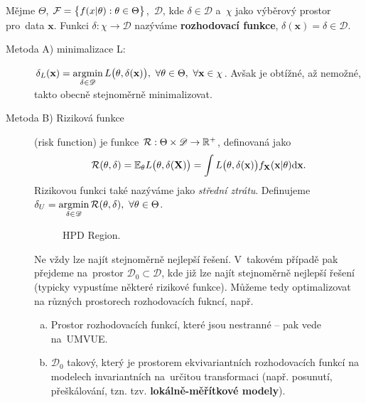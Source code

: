 \begin{define}
	Mějme $\Theta$, $\mathcal{F}=\big\{ f(x|\theta):\theta\in\Theta \big\}$,~$\mathscr{D}$, kde $\delta\in\mathscr{D}$ a~$\chi$ jako výběrový prostor pro~data $\textbf{x}$. Funkci $\delta:\chi\to\mathscr{D}$ nazýváme \textbf{rozhodovací funkce}, $\delta(\textbf{x})=\delta\in\mathscr{D}$. 
\end{define}
\begin{description}
	\item[Metoda A) minimalizace L:] $\delta_L(\textbf{x})=\mathop{\mathrm{argmin}}\limits_{\delta\in\mathscr{D}} L\big(\theta,\delta(\textbf{x})\big),~\forall \theta\in\Theta,~\forall\textbf{x}\in\chi$. Avšak je obtížné, až nemožné, takto obecně stejnoměrně minimalizovat.
	\item[Metoda B) Riziková funkce] (risk function) je funkce $\mathcal{R}:\Theta\times\mathscr{D}\to\mathbb{R}^+$, definovaná jako $$\mathcal{R}(\theta,\delta)=\mathbb{E}_\theta L\big(\theta,\delta(\textbf{X})\big)=\int L\big(\theta,\delta(\textbf{x})\big)f_\textbf{X}(\textbf{x}|\theta)\mathrm{d}\textbf{x}.$$
	Rizikovou funkci také nazýváme jako \textit{střední ztrátu}. Definujeme $\delta_U=\mathop{\mathrm{argmin}}\limits_{\delta\in\mathscr{D}} \mathcal{R}(\theta,\delta),~\forall\theta\in\Theta$.
	
	\begin{figure}[h]
		\centering
		\caption{HPD Region.}
	\end{figure}
	
	Ne vždy lze najít stejnoměrně nejlepší řešení. V~takovém případě pak přejdeme na~prostor $\mathscr{D}_0\subset\mathscr{D}$, kde již lze najít stejnoměrně nejlepší řešení (typicky vypustíme některé rizikové funkce). Můžeme tedy optimalizovat na různých prostorech rozhodovacích fukncí, např.
	\begin{enumerate}[a)]
		\item  Prostor rozhodovacích funkcí, které jsou nestranné -- pak vede na~UMVUE.
		\item $\mathscr{D}_0$ takový, který je prostorem ekvivariantních rozhodovacích funkcí na modelech invariantních na~určitou transformaci (např. posunutí, přeškálování, tzn. tzv. \textbf{lokálně-měřítkové modely}).
	\end{enumerate}
	

\end{description}
